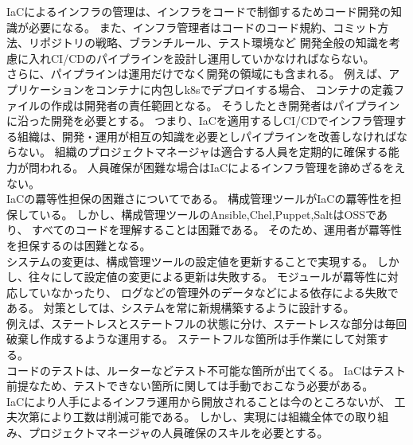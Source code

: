 IaCによるインフラの管理は、インフラをコードで制御するためコード開発の知識が必要になる。
また、インフラ管理者はコードのコード規約、コミット方法、リポジトリの戦略、ブランチルール、テスト環境など
開発全般の知識を考慮に入れCI/CDのパイプラインを設計し運用していかなければならない。\\

さらに、パイプラインは運用だけでなく開発の領域にも含まれる。
例えば、アプリケーションをコンテナに内包しk8sでデプロイする場合、
コンテナの定義ファイルの作成は開発者の責任範囲となる。
そうしたとき開発者はパイプラインに沿った開発を必要とする。
つまり、IaCを適用するしCI/CDでインフラ管理する組織は、開発・運用が相互の知識を必要としパイプラインを改善しなければならない。
組織のプロジェクトマネージャは適合する人員を定期的に確保する能力が問われる。
人員確保が困難な場合はIaCによるインフラ管理を諦めざるをえない。\\

IaCの羃等性担保の困難さについてである。
構成管理ツールがIaCの羃等性を担保している。
しかし、構成管理ツールのAnsible,Chel,Puppet,SaltはOSSであり、
すべてのコードを理解することは困難である。
そのため、運用者が羃等性を担保するのは困難となる。\\


システムの変更は、構成管理ツールの設定値を更新することで実現する。
しかし、往々にして設定値の変更による更新は失敗する。
モジュールが羃等性に対応していなかったり、
ログなどの管理外のデータなどによる依存による失敗である。
対策としては、システムを常に新規構築するように設計する。\\
例えば、ステートレスとステートフルの状態に分け、ステートレスな部分は毎回破棄し作成するような運用する。
ステートフルな箇所は手作業にして対策する。\\

コードのテストは、ルーターなどテスト不可能な箇所が出てくる。
IaCはテスト前提なため、テストできない箇所に関しては手動でおこなう必要がある。\\

IaCにより人手によるインフラ運用から開放されることは今のところないが、
工夫次第により工数は削減可能である。
しかし、実現には組織全体での取り組み、プロジェクトマネージャの人員確保のスキルを必要とする。
